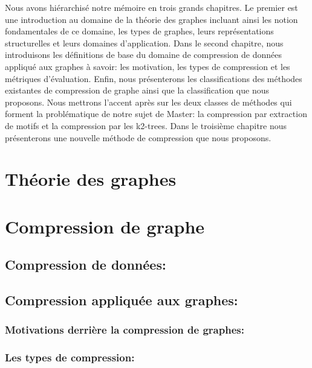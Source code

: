 \documentclass[a4paper,oneside,12pt]{report}
\theoremstyle{definition}
\begin{document}
			
			 Nous avons hiérarchisé notre mémoire en trois grands chapitres. Le premier est une introduction au domaine de la théorie des graphes incluant ainsi les notion fondamentales de ce domaine, les types de graphes, leurs représentations structurelles et leurs domaines d'application. Dans le second chapitre, nous introduisons les définitions de base du domaine de compression de données appliqué aux graphes à savoir: les motivation, les types de compression et les métriques d'évaluation. Enfin, nous présenterons les classifications des méthodes existantes de compression de graphe ainsi que la classification que nous proposons. Nous mettrons l'accent après sur les deux classes de méthodes qui forment la problématique de notre sujet de Master: la compression par extraction de motifs et la compression par les k2-trees. Dans le troisième chapitre nous présenterons une nouvelle méthode de compression que nous proposons.
	



	\chapter{ Théorie des graphes}
	  
	

	\chapter{Compression de graphe}
		
		\section{Compression de données: }
			
		
		\section{Compression appliquée aux graphes:}
			
			\subsection{Motivations derrière la compression de graphes: }
	
			\subsection{Les types de compression:}
			
			
\end{document}
